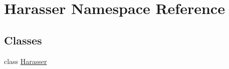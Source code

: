 \hypertarget{namespaceHarasser}{\section{Harasser Namespace Reference}
\label{namespaceHarasser}
}
\subsection*{Classes}
\begin{DoxyCompactItemize}
\item 
class \hyperlink{classHarasser_1_1Harasser}{Harasser}
\end{DoxyCompactItemize}
